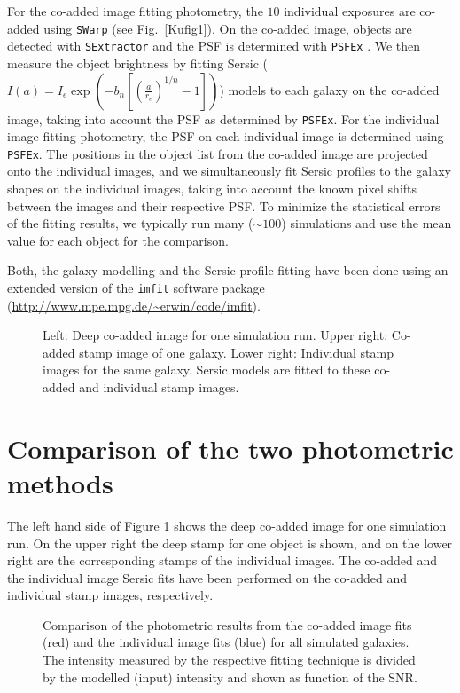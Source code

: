 For the co-added image
fitting photometry, the $10$ individual exposures are co-added using {\tt SWarp}
(see Fig.\ \ref{Kufig1}). On the co-added image,
objects are detected with {\tt SExtractor}  and the PSF is determined
with {\tt PSFEx} \citep{2011ASPC..442..435B}.
We then measure the object brightness by fitting
Sersic ($I(a) = I_e \exp(-b_n[(\frac{a}{r_e})^{1/n}-1])$)
models to each galaxy on the co-added image, taking into account the PSF as determined
by {\tt PSFEx}.
For the individual image fitting photometry, the PSF on each individual image is determined using
{\tt PSFEx}. The positions in the object list from the co-added image are projected onto the
individual images, and we simultaneously fit Sersic profiles to the galaxy shapes on the individual images,
taking into account the known pixel shifts between the images and their respective PSF.
To minimize the statistical errors of the fitting results, we typically run many ($\sim100$)
simulations and use the mean value for each object for the comparison.

Both, the galaxy modelling and the Sersic profile fitting have been done using an extended
version of the {\tt imfit} software
package (\url{http://www.mpe.mpg.de/~erwin/code/imfit}).
\begin{figure}[t]
\caption{Left: Deep co-added image for one simulation run. Upper right: Co-added stamp image
of one galaxy. Lower right: Individual stamp images for the same galaxy. Sersic models are fitted
to these co-added and individual stamp images.}
\label{fig2}
\end{figure}
\section{Comparison of the two photometric methods}
The left hand side of Figure \ref{fig2} shows the deep co-added image for one simulation run.
On the upper right the deep stamp for one object is shown, and on the lower right
are the corresponding stamps of the individual images. The co-added and the individual
image Sersic fits have been performed on the co-added and individual stamp images, respectively.
\begin{figure}[t]
\caption{Comparison of the photometric results from the co-added image fits (red) and the
individual image fits (blue) for all simulated galaxies. The intensity measured by the respective
fitting technique is divided by the modelled (input) intensity and shown as function of the
SNR.}
\label{fig3}
\end{figure}


